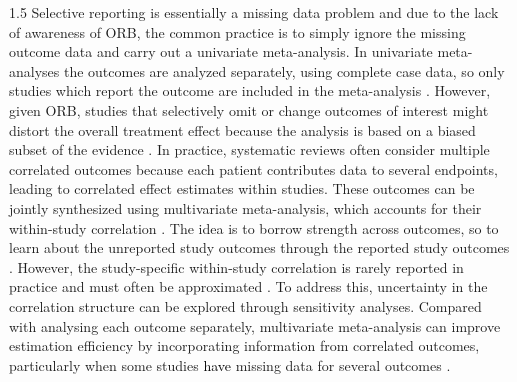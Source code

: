 \documentclass{article}
\newcommand{\mycolor}[1]{\textcolor{black}{#1}}
\begin{document}
\begin{spacing}{1.5}
Selective reporting is essentially a missing data problem and due to the lack of awareness of ORB, the common practice is to simply ignore the missing outcome data and carry out a univariate meta-analysis. In univariate meta-analyses the outcomes are analyzed separately, using complete case data, so only studies which report the outcome are included in the meta-analysis \cite{riley2007evaluation}. However, given ORB, studies that selectively omit or change outcomes of interest might distort the overall treatment effect because the analysis is based on a biased subset of the evidence \cite{thomas2022catalogue, dwan2010assessing}. In practice, systematic reviews often consider multiple correlated outcomes because each patient contributes data to several endpoints, leading to correlated effect estimates within studies. These outcomes can be jointly synthesized using multivariate meta-analysis, which accounts for their within-study correlation \cite{riley2007evaluation, jackson2011multivariate}. The idea is to borrow strength across outcomes, so to learn about the unreported study outcomes through the reported study outcomes \cite{kirkham2012multivariate}. However, the study-specific within-study correlation is rarely reported in practice and must often be approximated \cite{riley2009multivariate, jackson2011multivariate}. To address this, uncertainty in the correlation structure can be explored through sensitivity analyses. Compared with analysing each outcome separately, multivariate meta-analysis can improve estimation efficiency by incorporating information from correlated outcomes, particularly when some studies \mycolor{have} missing data for several outcomes \cite{jackson2011multivariate, riley2009multivariate, frosi2015multivariate}.


\end{spacing}
\end{document}
